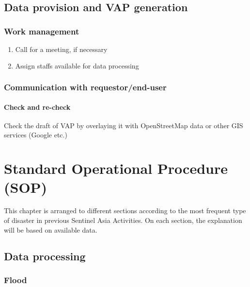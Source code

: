 \documentclass[]{book}
\providecommand{\tightlist}{%
  \setlength{\itemsep}{0pt}\setlength{\parskip}{0pt}}
\begin{document}
\section{Data provision and VAP
generation}\label{data-provision-and-vap-generation}

\subsection{Work management}\label{work-management-1}

\begin{enumerate}
\def\labelenumi{\arabic{enumi}.}
\tightlist
\item
  Call for a meeting, if necessary
\item
  Assign staffs available for data processing
\end{enumerate}

\subsection{Communication with
requestor/end-user}\label{communication-with-requestorend-user}

\subsubsection{Check and re-check}\label{check-and-re-check}

Check the draft of VAP by overlaying it with OpenStreetMap data or other
GIS services (Google etc.)

\chapter{Standard Operational Procedure
(SOP)}\label{standard-operational-procedure-sop}

This chapter is arranged to different sections according to the most
frequent type of disaster in previous Sentinel Asia Activities. On each
section, the explanation will be based on available data.

\section{Data processing}\label{data-processing}

\subsection{Flood}\label{flood}
\end{document}
